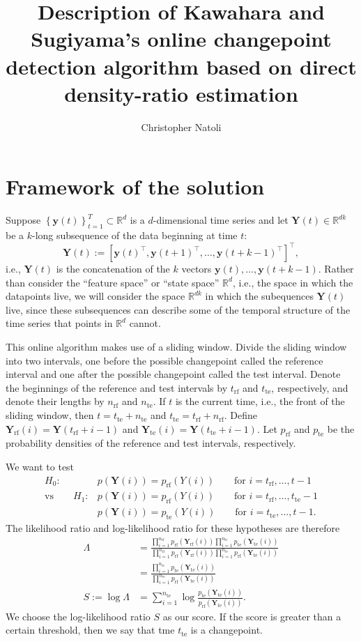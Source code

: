 \documentclass[12pt]{article}
\title{\normalsize\sc Description of Kawahara and Sugiyama's online changepoint detection algorithm based on direct density-ratio estimation}
\author{\normalsize Christopher Natoli}
\date{}
\newcommand\bkt[1]{\left[ #1 \right]}
\newcommand\set[1]{\left\{ #1 \right\}}
\newcommand\RR{\mathbb{R}}
\newcommand\yy{\boldsymbol{y}}
\newcommand\YY{\boldsymbol{Y}}
\newcommand\rf{{\mathrm{rf}}}
\newcommand\te{{\mathrm{te}}}
\begin{document}
\maketitle

\section{Framework of the solution}

Suppose $\set{\yy(t)}_{t=1}^T\subset\RR^d$ is a $d$-dimensional time series and let $\YY(t)\in\RR^{dk}$ be a $k$-long subsequence of the data beginning at time $t$:
$$\YY(t):=\bkt{\yy(t)^\top, \yy(t+1)^\top, \ldots, \yy(t+k-1)^\top}^\top,$$
i.e., $\YY(t)$ is the concatenation of the $k$ vectors $\yy(t),\ldots,\yy(t+k-1)$. Rather than consider the ``feature space'' or ``state space'' $\RR^d$, i.e., the space in which the datapoints live, we will consider the space $\RR^{dk}$ in which the subequences $\YY(t)$ live, since these subsequences can describe some of the temporal structure of the time series that points in $\RR^d$ cannot.

This online algorithm makes use of a sliding window. Divide the sliding window into two intervals, one before the possible changepoint called the reference interval and one after the possible changepoint called the test interval. Denote the beginnings of the reference and test intervals by $t_\rf$ and $t_\te$, respectively, and denote their lengths by $n_\rf$ and $n_\te$. If $t$ is the current time, i.e., the front of the sliding window, then $t=t_\te+n_\te$ and $t_\te=t_\rf+n_\rf$. Define $\YY_\rf(i)=\YY(t_\rf+i-1)$ and $\YY_\te(i)=\YY(t_\te+i-1)$. Let $p_\rf$ and $p_\te$ be the probability densities of the reference and test intervals, respectively.

We want to test
\begin{align*}
  H_0\colon&p(\YY(i))=p_\rf(Y(i))\quad\quad\text{for $i=t_\rf,\ldots,t-1$}\\
  \text{vs}\quad\quad
  H_1\colon&p(\YY(i))=p_\rf(Y(i))\quad\quad\text{for $i=t_\rf,\ldots,t_\te-1$}\\
  &p(\YY(i))=p_\te(Y(i))\quad\quad\text{for $i=t_\te,\ldots,t-1$}.
\end{align*}
The likelihood ratio and log-likelihood ratio for these hypotheses are therefore
\begin{align*}
  \Lambda
  &=\frac{\prod_{i=1}^{n_\rf}p_\rf(\YY_\rf(i))\prod_{i=1}^{n_\te}p_\te(\YY_\te(i))}{\prod_{i=1}^{n_\rf}p_\rf(\YY_\rf(i))\prod_{i=1}^{n_\te}p_\rf(\YY_\te(i))}\\
  &=\frac{\prod_{i=1}^{n_\te}p_\te(\YY_\te(i))}{\prod_{i=1}^{n_\te}p_\rf(\YY_\te(i))}\\
  S:=\log\Lambda&=\sum_{i=1}^{n_\te}\log\frac{p_\te(\YY_\te(i))}{p_\rf(\YY_\te(i))}.
\end{align*}
We choose the log-likelihood ratio $S$ as our score. If the score is greater than a certain threshold, %
then we say that tme $t_\te$ is a changepoint.
\end{document}
